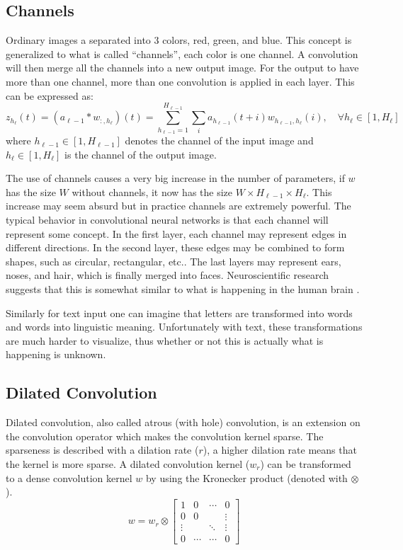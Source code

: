 \subsection{Channels}
Ordinary images a separated into 3 colors, red, green, and blue. This concept is generalized to what is called ``channels'', each color is one channel. A convolution will then merge all the channels into a new output image. For the output to have more than one channel, more than one convolution is applied in each layer. This can be expressed as:
\begin{equation}
z_{h_\ell}(t) = (a_{\ell-1} * w_{:, h_\ell})(t) = \sum_{h_{\ell-1}=1}^{H_{\ell-1}} \sum_{i} a_{h_{\ell-1}}(t + i) w_{h_{\ell-1}, h_\ell}(i), \quad \forall h_\ell \in [1, H_\ell]
\end{equation}
where $h_{\ell-1} \in [1, H_{\ell-1}]$ denotes the channel of the input image and $h_\ell \in [1, H_\ell]$ is the channel of the output image.

The use of channels causes a very big increase in the number of parameters, if $w$ has the size $W$ without channels, it now has the size $W \times H_{\ell-1} \times H_\ell$. This increase may seem absurd but in practice channels are extremely powerful. The typical behavior in convolutional neural networks is that each channel will represent some concept. In the first layer, each channel may represent edges in different directions. In the second layer, these edges may be combined to form shapes, such as circular, rectangular, etc.. The last layers may represent ears, noses, and hair, which is finally merged into faces. Neuroscientific research suggests that this is somewhat similar to what is happening in the human brain \cite[chapter 9.10]{deep-learning}.

Similarly for text input one can imagine that letters are transformed into words and words into linguistic meaning. Unfortunately with text, these transformations are much harder to visualize, thus whether or not this is actually what is happening is unknown.

\subsection{Dilated Convolution}

Dilated convolution, also called atrous (with hole) convolution, is an extension on the convolution operator which makes the convolution kernel sparse. The sparseness is described with a dilation rate ($r$), a higher dilation rate means that the kernel is more sparse. A dilated convolution kernel ($w_r$) can be transformed to a dense convolution kernel $w$ by using the Kronecker product (denoted with $\otimes$).
\begin{equation}
w = w_r \otimes \begin{bmatrix}
1      & 0      & \cdots & 0      \\
0      & 0      &        & \vdots \\
\vdots &        & \ddots & \vdots \\
0      & \cdots & \cdots & 0
\end{bmatrix}
\end{equation}

